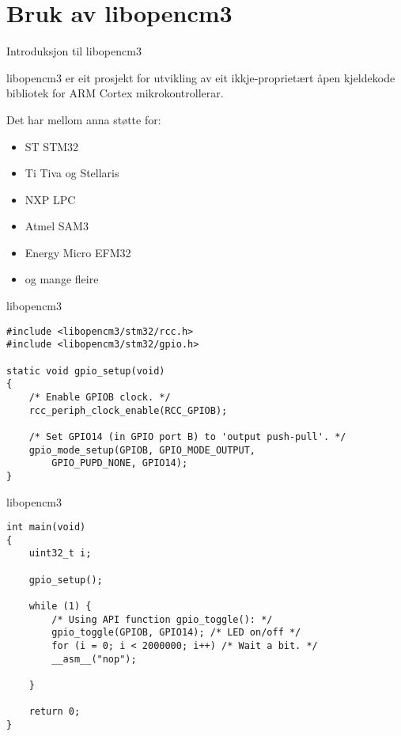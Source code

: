 \section{Bruk av libopencm3}

\begin{frame}{Introduksjon til libopencm3}
	
	libopencm3 er eit prosjekt for utvikling av eit ikkje-proprietært åpen kjeldekode bibliotek for ARM Cortex mikrokontrollerar.
	
	Det har mellom anna støtte for:
	
	\begin{itemize}
		\item ST STM32
		\item Ti Tiva og Stellaris
		\item NXP LPC
		\item Atmel SAM3
		\item Energy Micro EFM32
		\item og mange fleire
	\end{itemize}
	
\end{frame}




\begin{frame}[containsverbatim]{libopencm3}
	
	\begin{verbatim}
#include <libopencm3/stm32/rcc.h>
#include <libopencm3/stm32/gpio.h>

static void gpio_setup(void)
{
	/* Enable GPIOB clock. */
	rcc_periph_clock_enable(RCC_GPIOB);
	
	/* Set GPIO14 (in GPIO port B) to 'output push-pull'. */
	gpio_mode_setup(GPIOB, GPIO_MODE_OUTPUT,
		GPIO_PUPD_NONE, GPIO14);
}
	\end{verbatim}
	
\end{frame}

\begin{frame}[containsverbatim]{libopencm3}
	
	\begin{verbatim}
int main(void)
{
	uint32_t i;
	
	gpio_setup();
	
	while (1) {
		/* Using API function gpio_toggle(): */
		gpio_toggle(GPIOB, GPIO14);	/* LED on/off */
		for (i = 0; i < 2000000; i++) /* Wait a bit. */
		__asm__("nop");
		
	}
	
	return 0;
}
	\end{verbatim}
	
\end{frame}
